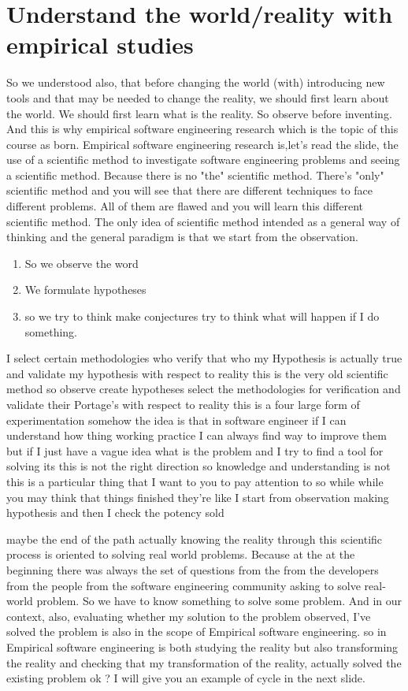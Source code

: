 \documentclass[conference, compsoc, twoside]{IEEEtran}
\begin{document}
\section{Understand the world/reality with empirical studies} %
\label{sec:understand_the_world}
 So we understood also, that before changing the world (with) introducing new tools and that may be needed to change the reality, we should first learn about the world.
 We should first learn what is the reality. So observe before inventing.
 And this is why empirical software engineering research which is the topic of this course as born.
 Empirical software engineering research is,let's read the slide, the use of a scientific method to investigate software engineering problems and seeing a scientific method.
 Because there is no "the" scientific method. 
 There's "only" scientific method and you will see that there are different techniques to face different problems.
 All of them are flawed and you will learn this different scientific method.
 The only idea of scientific method intended as a general way of thinking and the general paradigm is that we start from the observation. 
 \begin{enumerate}
 	\item So we observe the word
 	\item We formulate hypotheses
 	\item so we try to think make conjectures try to think what will happen if I do something.
 \end{enumerate}
   
 I select certain methodologies who verify that who my Hypothesis is actually true and validate my hypothesis with respect to reality this is the very old scientific method so observe create hypotheses select the methodologies for verification and validate their Portage's with respect to reality this is a four large form of experimentation somehow the idea is that in software engineer if I can understand how thing working practice I can always find way to improve them but if I just have a vague idea what is the problem and I try to find a tool for solving its this is not the right direction so knowledge and understanding is not this is a particular thing that I want to you to pay attention to so while while you may think that things finished they're like I start from observation making hypothesis and then I check the potency sold 

 maybe the end of the path actually knowing the reality through this scientific process is oriented to solving real world problems.
 Because at the at the beginning there was always the set of questions from the from the developers from the people from the software engineering community asking to solve real-world problem.
 So we have to know something to solve some problem.
 And in our context, also, evaluating whether my solution to the problem observed, I've solved the problem is also in the scope of Empirical software engineering.
 so in Empirical software engineering is both studying the reality but also transforming the reality and checking that my transformation of the reality, actually solved the existing problem ok ? 
 I will give you an example of cycle in the next slide. 
\end{document}
